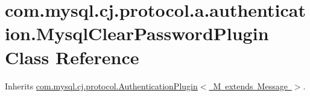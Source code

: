 \hypertarget{classcom_1_1mysql_1_1cj_1_1protocol_1_1a_1_1authentication_1_1_mysql_clear_password_plugin}{}\section{com.\+mysql.\+cj.\+protocol.\+a.\+authentication.\+Mysql\+Clear\+Password\+Plugin Class Reference}
\label{classcom_1_1mysql_1_1cj_1_1protocol_1_1a_1_1authentication_1_1_mysql_clear_password_plugin}


Inherits \mbox{\hyperlink{interfacecom_1_1mysql_1_1cj_1_1protocol_1_1_authentication_plugin}{com.\+mysql.\+cj.\+protocol.\+Authentication\+Plugin$<$ M extends Message $>$}}.

